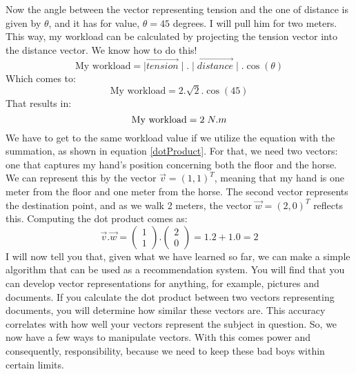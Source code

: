 \documentclass[600paper, 11pt,twoside,openany]{kdp}
\begin{document}
Now the angle between the vector representing tension and the one of distance is given by $\theta$, and it has for value, $\theta = 45$ degrees. I will pull him for two meters. This way, my workload can be calculated by projecting the tension vector into the distance vector. We know how to do this!
\[\textrm{My workload} = \mid \overrightarrow{tension}\mid.\mid \overrightarrow{distance}\mid.\cos(\theta)\]
\indent Which comes to:
\[\textrm{My workload} = 2.\sqrt{2}.\cos(45)\]
\indent That results in:
\[\textrm{My workload} = 2 \hspace{1mm} N.m\]
\indent We have to get to the same workload value if we utilize the equation with the summation, as shown in equation \ref{dotProduct}. For that, we need two vectors: one that captures my hand's position concerning both the floor and the horse. We can represent this by the vector $\overrightarrow{v} = (1,1)^T$, meaning that my hand is one meter from the floor and one meter from the horse. The second vector represents the destination point, and as we walk 2 meters, the vector $\overrightarrow{w} = (2,0)^T$ reflects this. Computing the dot product comes as:
\[\overrightarrow{v}.\overrightarrow{w} = \begin{pmatrix}
1\\
1
\end{pmatrix}.\begin{pmatrix}
2\\
0
\end{pmatrix} = 1.2 + 1.0 = 2\]
\indent I will now tell you that, given what we have learned so far, we can make a simple algorithm that can be used as a recommendation system. You will find that you can develop vector representations for anything, for example, pictures and documents. If you calculate the dot product between two vectors representing documents, you will determine how similar these vectors are. This accuracy correlates with how well your vectors represent the subject in question. So, we now have a few ways to manipulate vectors. With this comes power and consequently, responsibility, because we need to keep these bad boys within certain limits.
\end{document}
